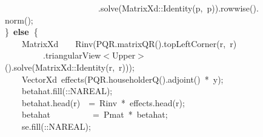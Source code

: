 \documentclass[shortnames,article,nojss]{jss}
\newcommand{\hlstd}[1]{\textcolor[rgb]{0,0,0}{#1}}
\newcommand{\hlopt}[1]{\textcolor[rgb]{0,0,0}{#1}}
\newcommand{\hlkwa}[1]{\textcolor[rgb]{0.61,0.13,0.93}{\bf{#1}}}
\newcommand{\hlkwd}[1]{\textcolor[rgb]{0,0,0}{#1}}
\begin{document}
\begin{figure}[htb]
    \hlstd{}\hlstd{\ \ \ \ \ \ \ \ \ \ \ \ \ \ \ \ \ \ \ \ \ \ }\hlstd{}\hlopt{.}\hlstd{}\hlkwd{solve}\hlstd{}\hlopt{(}\hlstd{MatrixXd}\hlopt{::}\hlstd{}\hlkwd{Identity}\hlstd{}\hlopt{(}\hlstd{p}\hlopt{,\ }\hlstd{p}\hlopt{)).}\hlstd{}\hlkwd{rowwise}\hlstd{}\hlopt{().}\hlstd{}\hlkwd{norm}\hlstd{}\hlopt{();}\hspace*{\fill}\\
    \hlstd{}\hlopt{\}\ }\hlstd{}\hlkwa{else\ }\hlstd{}\hlopt{\{}\hspace*{\fill}\\
    \hlstd{}\hlstd{\ \ \ \ }\hlstd{MatrixXd}\hlstd{\ \ \ \ }\hlstd{}\hlkwd{Rinv}\hlstd{}\hlopt{(}\hlstd{PQR}\hlopt{.}\hlstd{}\hlkwd{matrixQR}\hlstd{}\hlopt{().}\hlstd{}\hlkwd{topLeftCorner}\hlstd{}\hlopt{(}\hlstd{r}\hlopt{,\ }\hlstd{r}\hlopt{)}\hspace*{\fill}\\
    \hlstd{}\hlstd{\ \ \ \ \ \ \ \ \ }\hlstd{}\hlopt{.}\hlstd{triangularView}\hlopt{$<$}\hlstd{Upper}\hlopt{$>$().}\hlstd{}\hlkwd{solve}\hlstd{}\hlopt{(}\hlstd{MatrixXd}\hlopt{::}\hlstd{}\hlkwd{Identity}\hlstd{}\hlopt{(}\hlstd{r}\hlopt{,\ }\hlstd{r}\hlopt{)));}\hspace*{\fill}\\
    \hlstd{}\hlstd{\ \ \ \ }\hlstd{VectorXd\ }\hlkwd{effects}\hlstd{}\hlopt{(}\hlstd{PQR}\hlopt{.}\hlstd{}\hlkwd{householderQ}\hlstd{}\hlopt{().}\hlstd{}\hlkwd{adjoint}\hlstd{}\hlopt{()\ {*}\ }\hlstd{y}\hlopt{);}\hspace*{\fill}\\
    \hlstd{}\hlstd{\ \ \ \ }\hlstd{betahat}\hlopt{.}\hlstd{}\hlkwd{fill}\hlstd{}\hlopt{(::}\hlstd{NA\textunderscore REAL}\hlopt{);}\hspace*{\fill}\\
    \hlstd{}\hlstd{\ \ \ \ }\hlstd{betahat}\hlopt{.}\hlstd{}\hlkwd{head}\hlstd{}\hlopt{(}\hlstd{r}\hlopt{)}\hlstd{\ \ }\hlopt{=\ }\hlstd{Rinv\ }\hlopt{{*}\ }\hlstd{effects}\hlopt{.}\hlstd{}\hlkwd{head}\hlstd{}\hlopt{(}\hlstd{r}\hlopt{);}\hspace*{\fill}\\
    \hlstd{}\hlstd{\ \ \ \ }\hlstd{betahat}\hlstd{\ \ \ \ \ \ \ \ \ \ }\hlstd{}\hlopt{=\ }\hlstd{Pmat\ }\hlopt{{*}\ }\hlstd{betahat}\hlopt{;}\hspace*{\fill}\\
    \hlstd{}\hlstd{\ \ \ \ }\hlstd{se}\hlopt{.}\hlstd{}\hlkwd{fill}\hlstd{}\hlopt{(::}\hlstd{NA\textunderscore REAL}\hlopt{);}\hspace*{\fill}\\

\end{figure}
\end{document}
